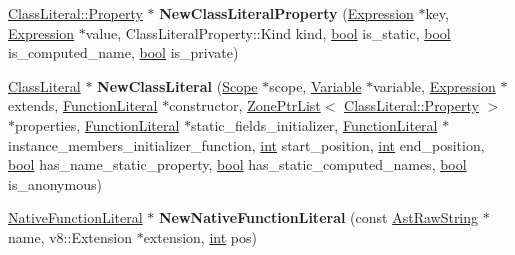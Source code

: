 \begin{DoxyCompactItemize}
\item 
\mbox{\label{classv8_1_1internal_1_1AstNodeFactory_a4f2ca6d2c383b652b60f153588b25691}} 
\mbox{\hyperlink{classv8_1_1internal_1_1ClassLiteralProperty}{Class\+Literal\+::\+Property}} $\ast$ {\bfseries New\+Class\+Literal\+Property} (\mbox{\hyperlink{classv8_1_1internal_1_1Expression}{Expression}} $\ast$key, \mbox{\hyperlink{classv8_1_1internal_1_1Expression}{Expression}} $\ast$value, Class\+Literal\+Property\+::\+Kind kind, \mbox{\hyperlink{classbool}{bool}} is\+\_\+static, \mbox{\hyperlink{classbool}{bool}} is\+\_\+computed\+\_\+name, \mbox{\hyperlink{classbool}{bool}} is\+\_\+private)
\item 
\mbox{\label{classv8_1_1internal_1_1AstNodeFactory_adfc736d36beda75dc7f71d96cc563414}} 
\mbox{\hyperlink{classv8_1_1internal_1_1ClassLiteral}{Class\+Literal}} $\ast$ {\bfseries New\+Class\+Literal} (\mbox{\hyperlink{classv8_1_1internal_1_1Scope}{Scope}} $\ast$scope, \mbox{\hyperlink{classv8_1_1internal_1_1Variable}{Variable}} $\ast$variable, \mbox{\hyperlink{classv8_1_1internal_1_1Expression}{Expression}} $\ast$extends, \mbox{\hyperlink{classv8_1_1internal_1_1FunctionLiteral}{Function\+Literal}} $\ast$constructor, \mbox{\hyperlink{classv8_1_1internal_1_1ZoneList}{Zone\+Ptr\+List}}$<$ \mbox{\hyperlink{classv8_1_1internal_1_1ClassLiteralProperty}{Class\+Literal\+::\+Property}} $>$ $\ast$properties, \mbox{\hyperlink{classv8_1_1internal_1_1FunctionLiteral}{Function\+Literal}} $\ast$static\+\_\+fields\+\_\+initializer, \mbox{\hyperlink{classv8_1_1internal_1_1FunctionLiteral}{Function\+Literal}} $\ast$instance\+\_\+members\+\_\+initializer\+\_\+function, \mbox{\hyperlink{classint}{int}} start\+\_\+position, \mbox{\hyperlink{classint}{int}} end\+\_\+position, \mbox{\hyperlink{classbool}{bool}} has\+\_\+name\+\_\+static\+\_\+property, \mbox{\hyperlink{classbool}{bool}} has\+\_\+static\+\_\+computed\+\_\+names, \mbox{\hyperlink{classbool}{bool}} is\+\_\+anonymous)
\item 
\mbox{\label{classv8_1_1internal_1_1AstNodeFactory_af90ceb5f7fb5259adc5d97273ba02cc8}} 
\mbox{\hyperlink{classv8_1_1internal_1_1NativeFunctionLiteral}{Native\+Function\+Literal}} $\ast$ {\bfseries New\+Native\+Function\+Literal} (const \mbox{\hyperlink{classv8_1_1internal_1_1AstRawString}{Ast\+Raw\+String}} $\ast$name, v8\+::\+Extension $\ast$extension, \mbox{\hyperlink{classint}{int}} pos)

\end{DoxyCompactItemize}
